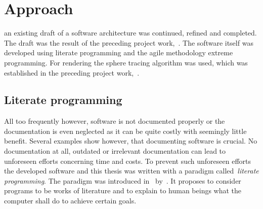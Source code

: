 
\section{Approach}

 an existing draft of a software
architecture was continued, refined and completed. The draft was the result of
the preceding project work,~. The software
itself was developed using literate programming and the agile methodology
extreme programming. For rendering the sphere tracing algorithm was used, which
was established in the preceding project
work,~.

\subsection{Literate programming}

 All too frequently however,
software is not documented properly or the documentation is even neglected as it
can be quite costly with seemingly little benefit. Several examples show
however, that documenting software is crucial. No documentation at all, outdated
or irrelevant documentation can lead to unforeseen efforts concerning time and
costs. To prevent such unforeseen efforts the developed software and this thesis
was written with a paradigm called~\emph{literate programming}. The paradigm was
introduced in~\citeyear{knuth-lp-1984} by~\citeauthor{knuth-lp-1984}. It
proposes to consider programs to be works of literature and to explain to human
beings what the computer shall do to achieve certain goals.

% 


